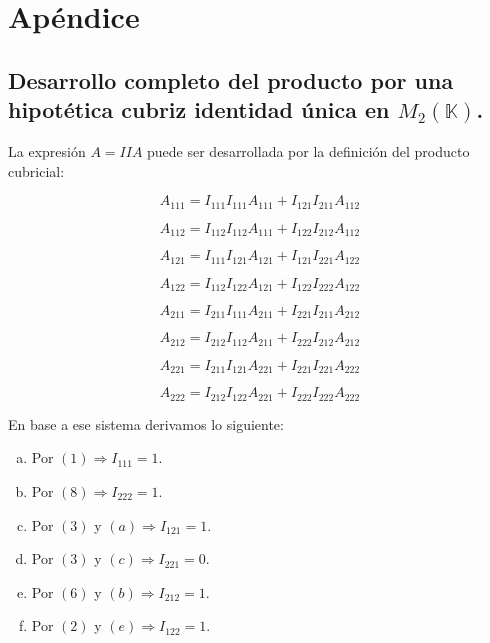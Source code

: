 \documentclass[a4paper, titlepage]{article}
\begin{document}
\section{Apéndice}

\subsection{Desarrollo completo del producto por una hipotética cubriz identidad única en $M_2 (\mathbb{K})$.}

La expresión $A = IIA$ puede ser desarrollada por la definición del producto cubricial:

\begin{equation}
A_{111} = I_{111} I_{111} A_{111} + I_{121} I_{211} A_{112}
\end{equation}

\begin{equation}
A_{112} = I_{112} I_{112} A_{111} + I_{122} I_{212} A_{112}
\end{equation}

\begin{equation}
A_{121} = I_{111} I_{121} A_{121} + I_{121} I_{221} A_{122}
\end{equation}

\begin{equation}
A_{122} = I_{112} I_{122} A_{121} + I_{122} I_{222} A_{122}
\end{equation}

\begin{equation}
A_{211} = I_{211} I_{111} A_{211} + I_{221} I_{211} A_{212}
\end{equation}

\begin{equation}
A_{212} = I_{212} I_{112} A_{211} + I_{222} I_{212} A_{212}
\end{equation}

\begin{equation}
A_{221} = I_{211} I_{121} A_{221} + I_{221} I_{221} A_{222}
\end{equation}

\begin{equation}
A_{222} = I_{212} I_{122} A_{221} + I_{222} I_{222} A_{222}
\end{equation}

En base a ese sistema derivamos lo siguiente:

\begin{enumerate}[(a)]
	\item Por $(1) \Rightarrow I_{111} = 1$.
	\item Por $(8) \Rightarrow I_{222} = 1$.
	\item Por $(3)$ y $(a) \Rightarrow I_{121} = 1$.
	\item Por $(3)$ y $(c) \Rightarrow I_{221} = 0$.
	\item Por $(6)$ y $(b) \Rightarrow I_{212} = 1$.
	\item Por $(2)$ y $(e) \Rightarrow I_{122} = 1$.
\end{enumerate}
\end{document}
